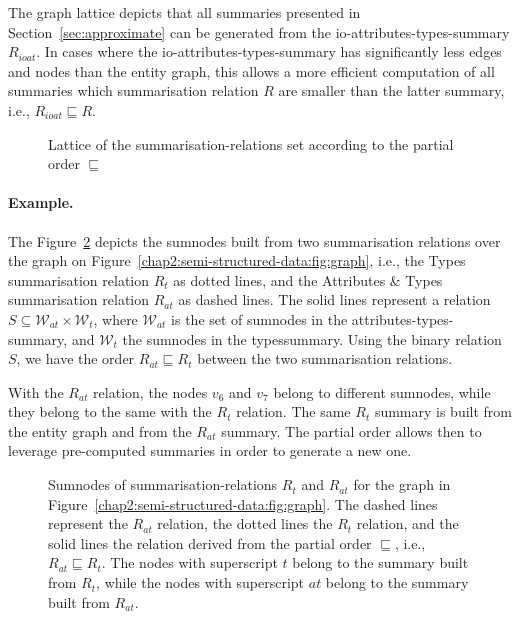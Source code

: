 \begin{remark}
The graph lattice depicts that all summaries presented in Section~\ref{sec:approximate} can be generated from the \gls{io-attributes-types-summary} $R_{ioat}$. In cases where the \gls{io-attributes-types-summary} has significantly less edges and nodes than the entity graph, this allows a more efficient computation of all summaries which summarisation relation $R$ are smaller than the latter summary, i.e., $R_{ioat} \sqsubseteq R$.
\end{remark}

\begin{figure}
	\centering
	
	\caption{Lattice of the \glspl{summarisation-relation} set according to the partial order $\sqsubseteq$}
	\label{chap5:precision:fig:lattice}
\end{figure}

\paragraph{Example.}

The Figure~\ref{fig:rel-order} depicts the sumnodes built from two summarisation relations over the graph on Figure~\ref{chap2:semi-structured-data:fig:graph}, i.e., the Types summarisation relation $R_t$ as dotted lines, and the Attributes \& Types summarisation relation $R_{at}$ as dashed lines. The solid lines represent a relation $S \subseteq \mathcal{W}_{at} \times \mathcal{W}_t$, where $\mathcal{W}_{at}$ is the set of sumnodes in the \gls{attributes-types-summary}, and $\mathcal{W}_{t}$ the sumnodes in the \gls{typessummary}.
Using the binary relation $S$, we have the order $R_{at} \sqsubseteq R_t$ between the two summarisation relations.

With the $R_{at}$ relation, the nodes $v_6$ and $v_7$ belong to different sumnodes, while they belong to the same with the $R_t$ relation. The same $R_t$ summary is built from the entity graph and from the $R_{at}$ summary. The partial order allows then to leverage pre-computed summaries in order to generate a new one.

\begin{figure}
	\centering
	
	\caption[Ordering of graph summaries]{Sumnodes of \glspl{summarisation-relation} $R_t$ and $R_{at}$ for the graph in Figure~\ref{chap2:semi-structured-data:fig:graph}. The dashed lines represent the $R_{at}$ relation, the dotted lines the $R_t$ relation, and the solid lines the relation derived from the partial order $\sqsubseteq$, i.e., $R_{at} \sqsubseteq R_t$. The nodes with superscript $t$ belong to the summary built from $R_t$, while the nodes with superscript $at$ belong to the summary built from $R_{at}$.}
	\label{fig:rel-order}
\end{figure}

